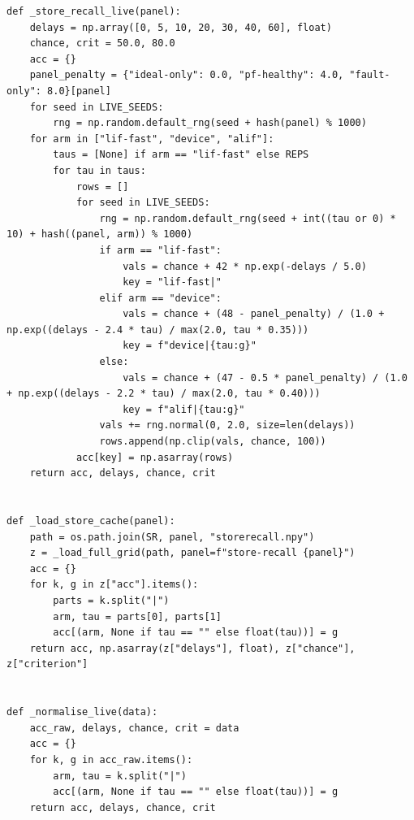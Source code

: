 \begin{lstlisting}[caption={experiments/temporal\_storerecall.ipynb},label={lst:mnn-nb-temporal-storerecall}]
def _store_recall_live(panel):
    delays = np.array([0, 5, 10, 20, 30, 40, 60], float)
    chance, crit = 50.0, 80.0
    acc = {}
    panel_penalty = {"ideal-only": 0.0, "pf-healthy": 4.0, "fault-only": 8.0}[panel]
    for seed in LIVE_SEEDS:
        rng = np.random.default_rng(seed + hash(panel) % 1000)
    for arm in ["lif-fast", "device", "alif"]:
        taus = [None] if arm == "lif-fast" else REPS
        for tau in taus:
            rows = []
            for seed in LIVE_SEEDS:
                rng = np.random.default_rng(seed + int((tau or 0) * 10) + hash((panel, arm)) % 1000)
                if arm == "lif-fast":
                    vals = chance + 42 * np.exp(-delays / 5.0)
                    key = "lif-fast|"
                elif arm == "device":
                    vals = chance + (48 - panel_penalty) / (1.0 + np.exp((delays - 2.4 * tau) / max(2.0, tau * 0.35)))
                    key = f"device|{tau:g}"
                else:
                    vals = chance + (47 - 0.5 * panel_penalty) / (1.0 + np.exp((delays - 2.2 * tau) / max(2.0, tau * 0.40)))
                    key = f"alif|{tau:g}"
                vals += rng.normal(0, 2.0, size=len(delays))
                rows.append(np.clip(vals, chance, 100))
            acc[key] = np.asarray(rows)
    return acc, delays, chance, crit


def _load_store_cache(panel):
    path = os.path.join(SR, panel, "storerecall.npy")
    z = _load_full_grid(path, panel=f"store-recall {panel}")
    acc = {}
    for k, g in z["acc"].items():
        parts = k.split("|")
        arm, tau = parts[0], parts[1]
        acc[(arm, None if tau == "" else float(tau))] = g
    return acc, np.asarray(z["delays"], float), z["chance"], z["criterion"]


def _normalise_live(data):
    acc_raw, delays, chance, crit = data
    acc = {}
    for k, g in acc_raw.items():
        arm, tau = k.split("|")
        acc[(arm, None if tau == "" else float(tau))] = g
    return acc, delays, chance, crit



\end{lstlisting}
